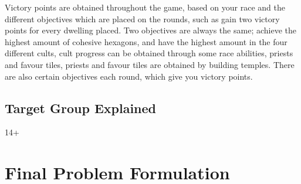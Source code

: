 Victory points are obtained throughout the game, based on your race and the different objectives which are placed on the rounds, such as gain two victory points for every dwelling placed. Two objectives are always the same; achieve the highest amount of cohesive hexagons, and have the highest amount in the four different cults, cult progress can be obtained through some race abilities, priests and favour tiles, priests and favour tiles are obtained by building temples. There are also certain objectives each round, which give you victory points. 

\subsection{Target Group Explained}
14+
\section{Final Problem Formulation}\label{sec:finalprob}

